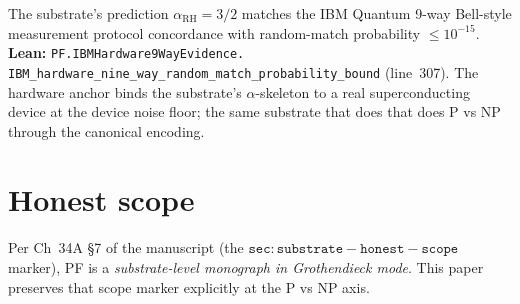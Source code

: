 \documentclass[11pt,a4paper]{article}
\theoremstyle{plain}
\theoremstyle{definition}
\begin{document}
The substrate's prediction $\alpha_{\mathrm{RH}} = 3/2$ matches the
IBM Quantum 9-way Bell-style measurement protocol concordance with
random-match probability $\le 10^{-15}$.
\textbf{Lean:}
\texttt{PF.IBMHardware9WayEvidence.\\
IBM\_hardware\_nine\_way\_random\_match\_probability\_bound}
(line~307). The hardware anchor binds the substrate's $\alpha$-skeleton
to a real superconducting device at the device noise floor; the same
substrate that does that does P vs NP through the canonical encoding.

\section{Honest scope}
\label{sec:honest-scope}

Per Ch~34A \S7 of the manuscript (the
$\mathtt{sec:substrate-honest-scope}$ marker), PF is a
\emph{substrate-level monograph in Grothendieck mode}. This paper
preserves that scope marker explicitly at the P vs NP axis.
\end{document}
